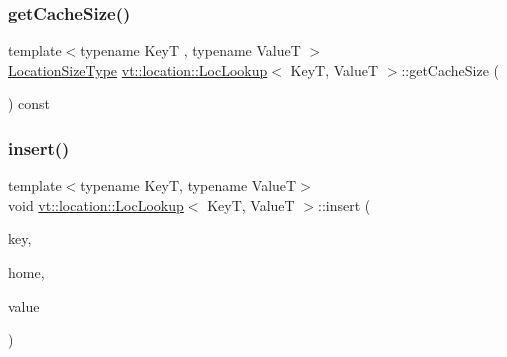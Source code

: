 \mbox{\label{structvt_1_1location_1_1_loc_lookup_a95081b04f2cd212457ec56c579ba988b}} 
\subsubsection{\texorpdfstring{get\+Cache\+Size()}{getCacheSize()}}
{\footnotesize\ttfamily template$<$typename KeyT , typename ValueT $>$ \\
\hyperlink{namespacevt_1_1location_ab1c4c5849012a23eee2fbd1fce6159d7}{Location\+Size\+Type} \hyperlink{structvt_1_1location_1_1_loc_lookup}{vt\+::location\+::\+Loc\+Lookup}$<$ KeyT, ValueT $>$\+::get\+Cache\+Size (\begin{DoxyParamCaption}{ }\end{DoxyParamCaption}) const}

\mbox{\label{structvt_1_1location_1_1_loc_lookup_a63ff201b384e4f65c02b3a99b8ba543e}} 
\subsubsection{\texorpdfstring{insert()}{insert()}}
{\footnotesize\ttfamily template$<$typename KeyT, typename ValueT$>$ \\
void \hyperlink{structvt_1_1location_1_1_loc_lookup}{vt\+::location\+::\+Loc\+Lookup}$<$ KeyT, ValueT $>$\+::insert (\begin{DoxyParamCaption}\item[{KeyT const \&}]{key,  }\item[{\hyperlink{namespacevt_a866da9d0efc19c0a1ce79e9e492f47e2}{Node\+Type} const}]{home,  }\item[{ValueT const \&}]{value }\end{DoxyParamCaption})}

\mbox{\label{structvt_1_1location_1_1_loc_lookup_a03bf48e7c5af3720c13e00ead13c83a0}} 
